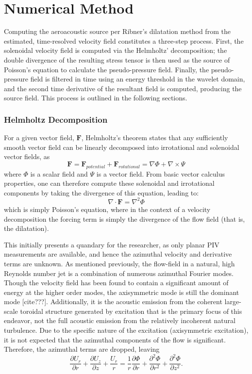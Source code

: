 \section{Numerical Method}
Computing the aeroacoustic source per Ribner's dilatation method from the estimated, time-resolved velocity field constitutes a three-step process. 
First, the solenoidal velocity field is computed via the Helmholtz' decomposition; the double divergence of the resulting stress tensor is then used as the source of Poisson's equation to calculate the pseudo-pressure field. 
Finally, the pseudo-pressure field is filtered in time using an energy threshold in the wavelet domain, and the second time derivative of the resultant field is computed, producing the source field.
This process is outlined in the following sections.
\subsubsection{Helmholtz Decomposition}
For a given vector field, $\mathbf{F}$, Helmholtz's theorem states that any sufficiently smooth vector field can be linearly decomposed into irrotational and solenoidal vector fields, as
\begin{equation}
\mathbf{F} = \mathbf{F}_{potential} + \mathbf{F}_{rotational} = \nabla \Phi + \nabla \times \Psi
\end{equation}
where $\Phi$ is a scalar field and $\Psi$ is a vector field.
From basic vector calculus properties, one can therefore compute these solenoidal and irrotational components by taking the divergence of this equation, leading to:
\begin{equation}
\nabla \cdot \mathbf{F} = \nabla^{2} \Phi
\end{equation}
which is simply Poisson's equation, where in the context of a velocity decomposition the forcing term is simply the divergence of the flow field (that is, the dilatation).

This initially presents a quandary for the researcher, as only planar PIV measurements are available, and hence the azimuthal velocity and derivative terms are unknown.
As mentioned previously, the flow-field in a natural, high Reynolds number jet is a combination of numerous azimuthal Fourier modes.
Though the velocity field has been found to contain a significant amount of energy at the higher order modes, the axisymmetric mode is still the dominant mode [cite???].
Additionally, it is the acoustic emission from the coherent large-scale toroidal structure generated by excitation that is the primary focus of this endeavor, not the full acoustic emission from the relatively incoherent natural turbulence.
Due to the specific nature of the excitation (axisymmetric excitation), it is not expected that the azimuthal components of the flow is significant.
Therefore, the azimuthal terms are dropped, leaving
\begin{equation}
\frac{\partial U_r}{\partial r} + \frac{\partial U_z}{\partial z} + \frac{U_r}{r} = \frac{1}{r} \frac{\partial \Phi}{\partial r} + \frac{\partial^2 \Phi}{\partial r^2} + \frac{\partial^2 \Phi}{\partial z^2}.
\label{eq:helmholtz}
\end{equation}

